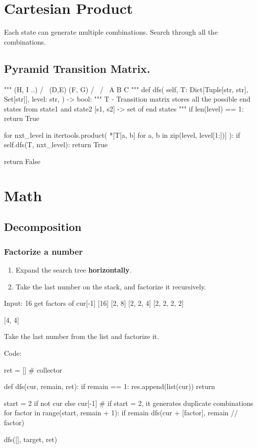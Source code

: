 \section{Cartesian Product}
Each state can generate multiple combinations. Search through all the combinations.
\subsection{Pyramid Transition Matrix.}
\begin{python}
"""
 (H, I ..)
   / \
(D,E) (F, G)
 / \ / \
A   B   C
"""
def dfs(
    self, 
    T: Dict[Tuple[str, str], Set[str]], 
    level: str,
) -> bool:
    """
    T - Transition matrix
    stores all the possible end states from state1 
    and state2
    [s1, s2] -> set of end states 
    """
    if len(level) == 1:
        return True

    for nxt_level in itertools.product(
        *[T[a, b] for a, b in zip(level, level[1:])]
    ):
        if self.dfs(T, nxt_level):
            return True

    return False

\end{python}


\section{Math}
\subsection{Decomposition}
\subsubsection{Factorize a number}\label{factorization}
\runinhead{Core clues:}
\begin{enumerate}
\item Expand the search tree \textbf{horizontally}.
\item Take the last number on the stack, and factorize it recursively.
\end{enumerate}
\rih{Search tree:}
\begin{python}
Input: 16
get factors of cur[-1]
[16]
[2, 8]
[2, 2, 4]
[2, 2, 2, 2]

[4, 4]
\end{python}
Take the last number from the list and factorize it.

Code:

\begin{python}
ret = []  # collector

def dfs(cur, remain, ret):
  if remain == 1:
    res.append(list(cur))
    return
        
  start = 2 if not cur else cur[-1]
  # if start = 2, it generates duplicate combinations
  for factor in range(start, remain + 1):
    if remain %
      dfs(cur + [factor], remain // factor)

dfs([], target, ret)
\end{python}

